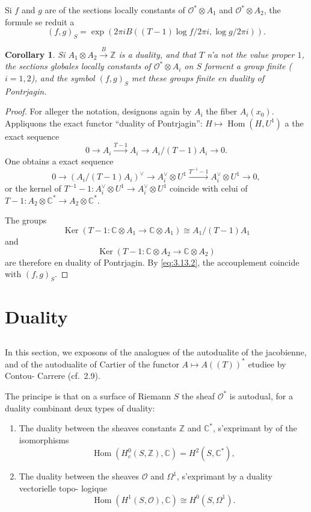 \documentclass[12pt,a4paper]{article}
\theoremstyle{plain}
\newtheorem{corollary}[theorem]{Corollary}
\theoremstyle{definition}
\theoremstyle{remark}
\DeclareMathOperator{\Ker}{Ker}
\DeclareMathOperator{\Hom}{Hom}
\newcommand{\cO}{\mathcal{O}}
\newcommand{\Z}{\mathbb{Z}}
\newcommand{\C}{\mathbb{C}}
\providecommand{\cO}{\mathcal{O}}
\providecommand{\Hom}{\operatorname{Hom}}
\providecommand{\Ker}{\operatorname{Ker}}
\begin{document}
Si $f$ and $g$ are of the sections locally constants of $\cO^* \otimes A_1$ and $\cO^* \otimes A_2$, the formule
se reduit a
\begin{equation}\label{eq:3.13.2}
(f, g)_S = \exp(2\pi i B((T - 1)\log f / 2\pi i, \log g / 2\pi i)).
\end{equation}

\begin{corollary}
Si $A_1 \otimes A_2 \xrightarrow{B} \Z$ is a duality, and that $T$ n'a not the value proper $1$, the
sections globales locally constants of $\cO^* \otimes A_i$ on $S$ forment a group finite ($i = 1, 2$), and the
symbol $(f,g)_S$ met these groups finite en duality of Pontrjagin.
\end{corollary}

\begin{proof}
For alleger the notation, designons again by $A_i$ the fiber $A_i(x_0)$. Appliquons the exact functor ``duality of Pontrjagin'': $H \mapsto \Hom(H, U^1)$ a the exact sequence
\[
0 \to A_i \xrightarrow{T-1} A_i \to A_i/(T-1)A_i \to 0.
\]
One obtains a exact sequence
\[
0 \to (A_i/(T-1)A_i)^\vee \to A_i^\vee \otimes U^1 \xrightarrow{T^{-1}-1} A_i^\vee \otimes U^1 \to 0,
\]
or the kernel of $T^{-1} - 1 : A_i^\vee \otimes U^1 \to A_i^\vee \otimes U^1$ coincide with celui of
$T - 1 : A_2 \otimes \C^* \to A_2 \otimes \C^*$.

The groups
\[
\Ker(T - 1 : \C \otimes A_1 \to \C \otimes A_1) \cong A_1/(T-1)A_1
\]
and
\[
\Ker(T - 1 : \C \otimes A_2 \to \C \otimes A_2)
\]
are therefore en duality of Pontrjagin. By \eqref{eq:3.13.2}, the accouplement coincide with $(f,g)_S$.
\end{proof}

\section{Duality}

\subsection{}

In this section, we exposons of the analogues of the autodualite of the
jacobienne, and of the autodualite of Cartier of the functor $A \mapsto A((T))^*$ etudiee by Contou-
Carrere (cf.~2.9).

The principe is that on a surface of Riemann $S$ the sheaf $\cO^*$ is autodual,
for a duality combinant deux types of duality:
\begin{enumerate}[label=\alph*)]
\item The duality between the sheaves constants $\Z$ and $\C^*$, s'exprimant by of the isomorphisms
\[
\Hom(H^0_c(S, \Z), \C) = H^2(S, \C^*),
\]
\item The duality between the sheaves $\cO$ and $\Omega^1$, s'exprimant by a duality vectorielle topo-
logique
\[
\Hom(H^1(S, \cO), \C) \cong H^0(S, \Omega^1).
\]
\end{enumerate}
\end{document}
